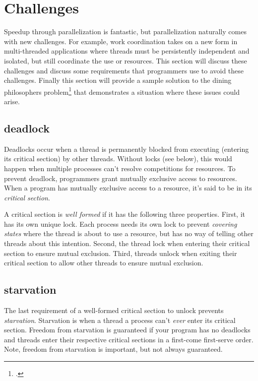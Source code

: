 \documentclass[titlepage]{article}
\begin{document}
\section{Challenges}

Speedup through parallelization is fantastic, but parallelization naturally comes with new challenges. For example, work coordination takes on a new form in multi-threaded applications where threads must be persistently independent and isolated, but still coordinate the use or resources. This section will discuss these challenges and discuss some requirements that programmers use to avoid these challenges. Finally this section will provide a sample solution to the dining philosophers problem\footcite[produced by dijkstra]{Dijkstra:1965:CSP:1102034} that demonstrates a situation where these issues could arise.


\subsection{deadlock}

Deadlocks occur when a thread is permanently blocked from executing (entering its critical section) by other threads. Without locks (see below), this would happen when multiple processes can't resolve competitions for resources. To prevent deadlock, programmers grant mutually exclusive access to resources. When a program has mutually exclusive access to a resource, it's said to be in its \textit{critical section}.

A critical section is \textit{well formed} if it has the following three properties. First, it has its own unique lock. Each process needs its own lock to prevent \textit{covering states} where the thread is about to use a resource, but has no way of telling other threads about this intention. Second, the thread lock when entering their critical section to ensure mutual exclusion. Third, threads unlock when exiting their critical section to allow other threads to ensure mutual exclusion.


\subsection{starvation}

The last requirement of a well-formed critical section to unlock prevents \textit{starvation}. Starvation is when a thread a process can't \textit{ever} enter its critical section. Freedom from starvation is guaranteed if your program has no deadlocks and threads enter their respective critical sections in a first-come first-serve order. Note, freedom from starvation is important, but not always guaranteed.
\end{document}
